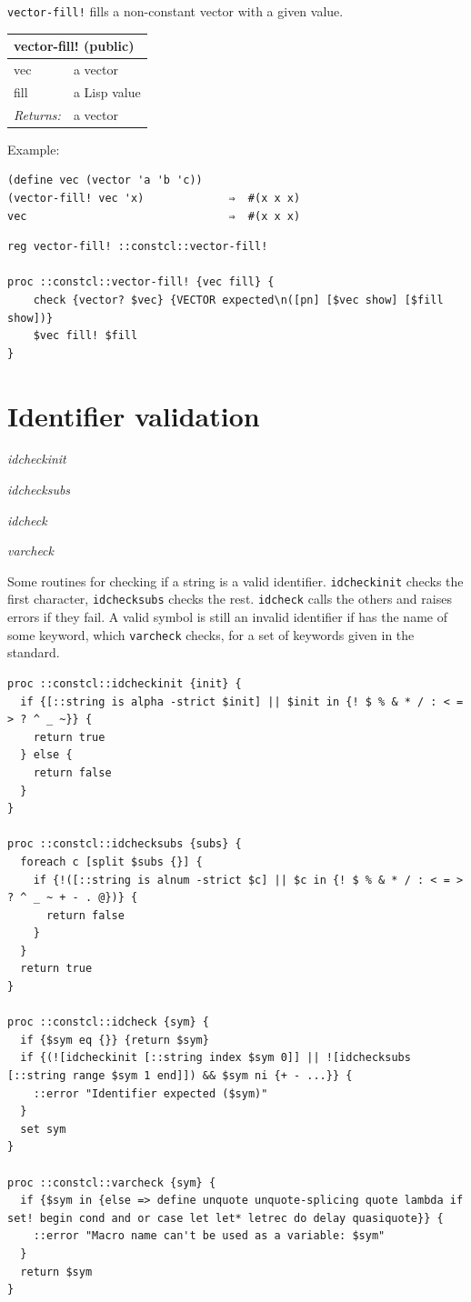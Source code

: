 \documentclass[twoside,9pt]{report}
\begin{document}
\texttt{vector-fill!} fills a non-constant vector with a given value.

\begin{tabular}{ |l l| }
\hline
\multicolumn{2}{|l|}{vector-fill! (public)} \\
\hline
vec & a vector \\
fill & a Lisp value \\
\textit{Returns:} & a vector \\
\hline
\end{tabular}


Example:

\noindent\makebox[\linewidth]{\rule{\linewidth}{0.4pt}}
\begin{lstlisting}
(define vec (vector 'a 'b 'c))
(vector-fill! vec 'x)             ⇒  #(x x x)
vec                               ⇒  #(x x x)
\end{lstlisting}
\noindent\makebox[\linewidth]{\rule{\linewidth}{0.4pt}}
\noindent\makebox[\linewidth]{\rule{\linewidth}{0.4pt}}
\begin{lstlisting}
reg vector-fill! ::constcl::vector-fill!
 
proc ::constcl::vector-fill! {vec fill} {
    check {vector? $vec} {VECTOR expected\n([pn] [$vec show] [$fill show])}
    $vec fill! $fill
}
\end{lstlisting}
\noindent\makebox[\linewidth]{\rule{\linewidth}{0.4pt}}
\chapter{Identifier validation}
\label{identifier-validation}

\emph{idcheckinit}


\emph{idchecksubs}


\emph{idcheck}


\emph{varcheck}


Some routines for checking if a string is a valid identifier. \texttt{idcheckinit} checks the first character, \texttt{idchecksubs} checks the rest. \texttt{idcheck} calls the others and raises errors if they fail. A valid symbol is still an invalid identifier if has the name of some keyword, which \texttt{varcheck} checks, for a set of keywords given in the standard.

\noindent\makebox[\linewidth]{\rule{\linewidth}{0.4pt}}
\begin{lstlisting}
proc ::constcl::idcheckinit {init} {
  if {[::string is alpha -strict $init] || $init in {! $ % & * / : < = > ? ^ _ ~}} {
    return true
  } else {
    return false
  }
}
 
proc ::constcl::idchecksubs {subs} {
  foreach c [split $subs {}] {
    if {!([::string is alnum -strict $c] || $c in {! $ % & * / : < = > ? ^ _ ~ + - . @})} {
      return false
    }
  }
  return true
}
 
proc ::constcl::idcheck {sym} {
  if {$sym eq {}} {return $sym}
  if {(![idcheckinit [::string index $sym 0]] || ![idchecksubs [::string range $sym 1 end]]) && $sym ni {+ - ...}} {
    ::error "Identifier expected ($sym)"
  }
  set sym
}
 
proc ::constcl::varcheck {sym} {
  if {$sym in {else => define unquote unquote-splicing quote lambda if set! begin cond and or case let let* letrec do delay quasiquote}} {
    ::error "Macro name can't be used as a variable: $sym"
  }
  return $sym
}
\end{lstlisting}
\noindent\makebox[\linewidth]{\rule{\linewidth}{0.4pt}}
\end{document}
